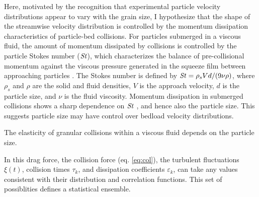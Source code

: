 Here, motivated by the recognition that experimental particle velocity distributions appear to vary with the grain size, I hypothesize that the shape of the streamwise velocity distribution is controlled by the momentum dissipation characteristics of particle-bed collisions.
For particles submerged in a viscous fluid, the amount of momentum dissipated by collisions is controlled by the particle Stokes number ($\mbox{\textit{St}}$), which characterizes the balance of pre-collisional momentum against the viscous pressure generated in the squeeze film between approaching particles \citep{}. The Stokes number is defined by $\mbox{\textit{St}} = \rho_s V d/(9\nu \rho)$, where $\rho_s$ and $\rho$ are the solid and fluid densities, $V$ is the approach velocity, $d$ is the particle size, and $\nu$ is the fluid viscosity. Momentum dissipation in submerged collisions shows a sharp dependence on $\mbox{\textit{St}}$ \citep{Joseph2001, Schmeeckle2001}, and hence also the particle size. This suggests particle size may have control over bedload velocity distributions.


The elasticity of granular collisions within a viscous fluid depends on the particle size.



In this drag force, the collision force (eq. \ref{eq:col}), the turbulent fluctuations $\xi(t)$, collision times $\tau_k$, and dissipation coefficients $\varepsilon_k$, can take any values consistent with their distribution and correlation functions. This set of possiblities defines a statistical ensemble.
